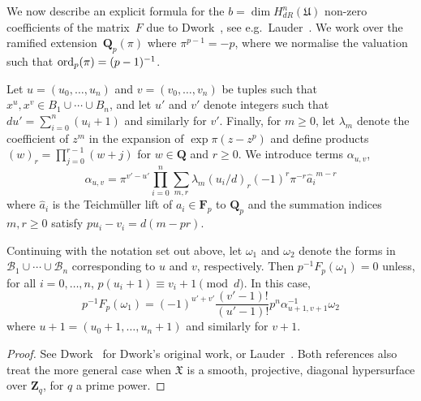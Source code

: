 We now describe an explicit formula for the $b = \dim H_{dR}^n(\mathfrak{U})$ 
non-zero coefficients of the matrix~$F$ due to Dwork~\citep{Dwork64}, see 
e.g.\ Lauder~\citep[\S 6.1]{Lau04}.   We work over the ramified 
extension~$\mathbf{Q}_p(\pi)$ where $\pi^{p-1} = -p$, where we normalise 
the valuation such that \mbox{$\operatorname{ord}_p(\pi) = (p-1)^{-1}$}.

Let $u = (u_0, \dotsc, u_n)$ and $v = (v_0, \dotsc, v_n)$ be tuples such 
that $x^u, x^v \in B_1 \cup \dotsb \cup B_n$,  and let $u'$ and $v'$ 
denote integers such that $d u' = \sum_{i=0}^n (u_i + 1)$ and similarly 
for $v'$.  Finally, for $m \geq 0$, let $\lambda_m$ denote the coefficient 
of $z^m$ in the expansion of $\exp \pi (z - z^p)$ and define products 
$(w)_r = \prod_{j=0}^{r-1} (w + j)$ for $w \in \mathbf{Q}$ and $r \geq 0$. 
We introduce terms $\alpha_{u,v}$, 
\begin{equation*}
\alpha_{u,v} = \pi^{v' - u'} \prod_{i = 0}^n \sum_{m, r} \lambda_m (u_i / d)_r (-1)^r \pi^{-r} {\hat{a}_i}^{m-r}
\end{equation*}
where $\hat{a}_i$ is the Teichm\"uller lift of $a_i \in \mathbf{F}_p$ 
to $\mathbf{Q}_p$ and the summation indices $m, r \geq 0$ satisfy 
$p u_i - v_i = d (m - pr)$.

\begin{thm} \label{thm:01-03-diagfrob}
Continuing with the notation set out above, let $\omega_1$ and $\omega_2$ 
denote the forms in $\mathcal{B}_1 \cup \dotsb \cup \mathcal{B}_n$ 
corresponding to $u$ and $v$, respectively.  
Then $p^{-1} F_p (\omega_1) = 0$ unless, for all $i = 0, \dotsc, n$, 
$p (u_i + 1) \equiv v_i + 1 \pmod{d}$.  In this case, 
\begin{equation*}
p^{-1} F_p (\omega_1) = 
    (-1)^{u' + v'} \frac{(v' - 1)!}{(u' - 1)!} p^n \alpha_{u+1,v+1}^{-1} \omega_2
\end{equation*}
where $u + 1 = (u_0 + 1, \dotsc, u_n + 1)$ and similarly for $v + 1$.
\end{thm}

\begin{proof}
See Dwork~\citep[\S 4]{Dwork64} for Dwork's original work, or 
Lauder~\citep[\S 6.1]{Lau04}.  Both references also treat the 
more general case when $\mathfrak{X}$ is a smooth, projective, 
diagonal hypersurface over $\mathbf{Z}_q$, for $q$ a prime power.
\end{proof}


